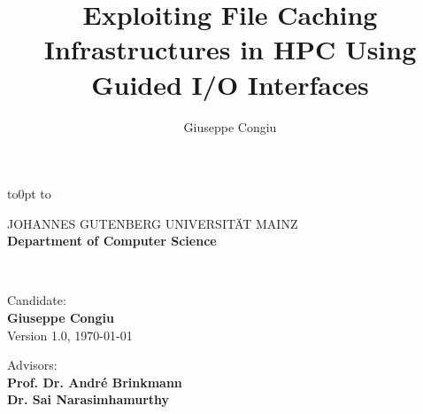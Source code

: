 \documentclass[a4paper,titlepage,oneside,11pt]{book}
\title{Exploiting File Caching Infrastructures in HPC Using Guided I/O Interfaces}
\author{Giuseppe Congiu}
\begin{document}
\hypersetup{citecolor=black,filecolor=black,linkcolor=black,urlcolor=blue} %

\begin{titlepage}
\thispagestyle{empty}

\begin{flushleft}
\vbox to0pt{
\vbox to\vss}
\end{flushleft}

\begin{center}
        \large JOHANNES GUTENBERG UNIVERSIT{\"A}T MAINZ \\
        \large \textbf{Department of Computer Science}
\end{center}

\begin{center}
	 \\
	\vspace{0.2cm}
\end{center}
\vspace{3cm}

\begin{flushright}
	Candidate:\\
	\textbf{Giuseppe Congiu}\\
	Version 1.0, \today
\end{flushright}

\begin{flushright}
	Advisors:\\
	\textbf{Prof. Dr. Andr\'e Brinkmann}\\
        \textbf{Dr. Sai Narasimhamurthy}
\end{flushright}

\end{titlepage}
\end{document}
